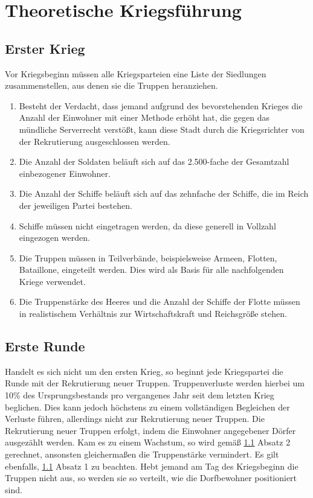\documentclass{article}
\begin{document}
\section{Theoretische Kriegsführung}
\subsection{Erster Krieg}\label{erster}
Vor Kriegsbeginn müssen alle Kriegsparteien eine Liste der Siedlungen zusammenstellen, aus denen sie die Truppen heranziehen.\\

\begin{enumerate}[(1)]
	\item Besteht der Verdacht, dass jemand aufgrund des bevorstehenden Krieges die Anzahl der Einwohner mit einer Methode erhöht hat, die gegen das mündliche Serverrecht verstößt, kann diese Stadt durch die Kriegsrichter von der Rekrutierung ausgeschlossen werden.
	\item Die Anzahl der Soldaten beläuft sich auf das 2.500-fache der Gesamtzahl einbezogener Einwohner.
	\item Die Anzahl der Schiffe beläuft sich auf das zehnfache der Schiffe, die im Reich der jeweiligen Partei bestehen.
	\item Schiffe müssen nicht eingetragen werden, da diese generell in Vollzahl eingezogen werden.
	\item Die Truppen müssen in Teilverbände, beispielsweise Armeen, Flotten, Bataillone, eingeteilt werden. Dies wird als Basis für alle nachfolgenden Kriege verwendet.
	\item Die Truppenstärke des Heeres und die Anzahl der Schiffe der Flotte müssen in realistischem Verhältnis zur Wirtschaftskraft und Reichsgröße stehen.
\end{enumerate}

\subsection{Erste Runde}
Handelt es sich nicht um den ersten Krieg, so beginnt jede Kriegspartei die Runde mit der Rekrutierung neuer Truppen. Truppenverluste werden hierbei
um 10\% des Ursprungsbestands pro vergangenes Jahr seit dem letzten Krieg beglichen. Dies kann jedoch höchstens zu einem vollständigen Begleichen der Verluste führen, allerdings nicht
zur Rekrutierung neuer Truppen. Die Rekrutierung neuer Truppen erfolgt, indem die Einwohner angegebener Dörfer ausgezählt werden. Kam es zu einem Wachstum, so wird gemäß \ref{erster} Absatz 2 gerechnet, ansonsten
gleichermaßen die Truppenstärke vermindert. Es gilt ebenfalls, \ref{erster} Absatz 1 zu beachten. Hebt jemand am Tag des Kriegsbeginn die Truppen nicht aus, so werden sie so verteilt, wie die Dorfbewohner positioniert sind.
\end{document}
